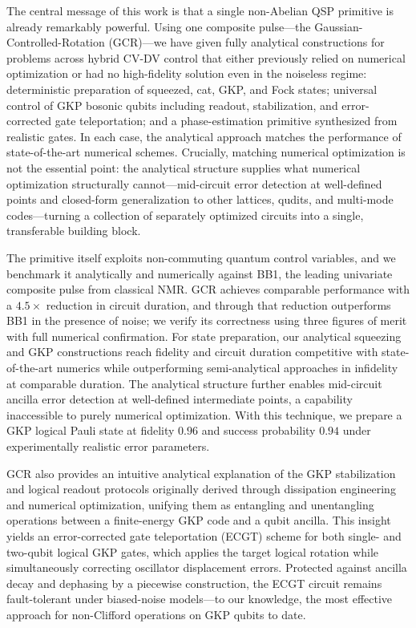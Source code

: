 \documentclass[aps,prx,showpacs,notitlepage,twocolumn,superscriptaddress,nofootinbib,preprintnumbers,floatfix,10pt, longbibliography]{revtex4-2}
\begin{document}
The central message of this work is that a single non-Abelian QSP primitive is already remarkably powerful. Using one composite pulse---the Gaussian-Controlled-Rotation (GCR)---we have given fully analytical constructions for problems across hybrid CV-DV control that either previously relied on numerical optimization or had no high-fidelity solution even in the noiseless regime: deterministic preparation of squeezed, cat, GKP, and Fock states; universal control of GKP bosonic qubits including readout, stabilization, and error-corrected gate teleportation; and a phase-estimation primitive synthesized from realistic gates. In each case, the analytical approach matches the performance of state-of-the-art numerical schemes. Crucially, matching numerical optimization is not the essential point: the analytical structure supplies what numerical optimization structurally cannot---mid-circuit error detection at well-defined points and closed-form generalization to other lattices, qudits, and multi-mode codes---turning a collection of separately optimized circuits into a single, transferable building block. 

The primitive itself exploits non-commuting quantum control variables, and we benchmark it analytically and numerically against BB1, the leading univariate composite pulse from classical NMR. GCR achieves comparable performance with a $4.5\times$ reduction in circuit duration, and through that reduction outperforms BB1 in the presence of noise; we verify its correctness using three figures of merit with full numerical confirmation. For state preparation, our analytical squeezing and GKP constructions reach fidelity and circuit duration competitive with state-of-the-art numerics while outperforming semi-analytical approaches in infidelity at comparable duration. The analytical structure further enables mid-circuit ancilla error detection at well-defined intermediate points, a capability inaccessible to purely numerical optimization. With this technique, we prepare a GKP logical Pauli state at fidelity $0.96$ and success probability $0.94$ under experimentally realistic error parameters. 

GCR also provides an intuitive analytical explanation of the GKP stabilization and logical readout protocols originally derived through dissipation engineering and numerical optimization, unifying them as entangling and unentangling operations between a finite-energy GKP code and a qubit ancilla. This insight yields an error-corrected gate teleportation (ECGT) scheme for both single- and two-qubit logical GKP gates, which applies the target logical rotation while simultaneously correcting oscillator displacement errors. Protected against ancilla decay and dephasing by a piecewise construction, the ECGT circuit remains fault-tolerant under biased-noise models---to our knowledge, the most effective approach for non-Clifford operations on GKP qubits to date. 
\end{document}
